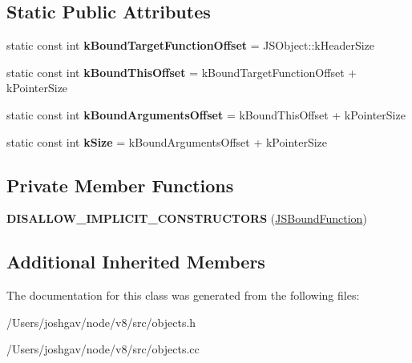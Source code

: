 \subsection*{Static Public Attributes}
\begin{DoxyCompactItemize}
\item 
static const int {\bfseries k\+Bound\+Target\+Function\+Offset} = J\+S\+Object\+::k\+Header\+Size\hypertarget{classv8_1_1internal_1_1_j_s_bound_function_a62d0e4a5d1205ca5db1560e9a5672a83}{}\label{classv8_1_1internal_1_1_j_s_bound_function_a62d0e4a5d1205ca5db1560e9a5672a83}

\item 
static const int {\bfseries k\+Bound\+This\+Offset} = k\+Bound\+Target\+Function\+Offset + k\+Pointer\+Size\hypertarget{classv8_1_1internal_1_1_j_s_bound_function_a9ffc641da476a34eb80b3fdfbb3847b3}{}\label{classv8_1_1internal_1_1_j_s_bound_function_a9ffc641da476a34eb80b3fdfbb3847b3}

\item 
static const int {\bfseries k\+Bound\+Arguments\+Offset} = k\+Bound\+This\+Offset + k\+Pointer\+Size\hypertarget{classv8_1_1internal_1_1_j_s_bound_function_a16d857627dcbec39f014440c076a2e0b}{}\label{classv8_1_1internal_1_1_j_s_bound_function_a16d857627dcbec39f014440c076a2e0b}

\item 
static const int {\bfseries k\+Size} = k\+Bound\+Arguments\+Offset + k\+Pointer\+Size\hypertarget{classv8_1_1internal_1_1_j_s_bound_function_aeebf3de5eb07077231f3dda43c17354f}{}\label{classv8_1_1internal_1_1_j_s_bound_function_aeebf3de5eb07077231f3dda43c17354f}

\end{DoxyCompactItemize}
\subsection*{Private Member Functions}
\begin{DoxyCompactItemize}
\item 
{\bfseries D\+I\+S\+A\+L\+L\+O\+W\+\_\+\+I\+M\+P\+L\+I\+C\+I\+T\+\_\+\+C\+O\+N\+S\+T\+R\+U\+C\+T\+O\+RS} (\hyperlink{classv8_1_1internal_1_1_j_s_bound_function}{J\+S\+Bound\+Function})\hypertarget{classv8_1_1internal_1_1_j_s_bound_function_ae416f0777736c3e887f46ab5e07913c0}{}\label{classv8_1_1internal_1_1_j_s_bound_function_ae416f0777736c3e887f46ab5e07913c0}

\end{DoxyCompactItemize}
\subsection*{Additional Inherited Members}


The documentation for this class was generated from the following files\+:\begin{DoxyCompactItemize}
\item 
/\+Users/joshgav/node/v8/src/objects.\+h\item 
/\+Users/joshgav/node/v8/src/objects.\+cc\end{DoxyCompactItemize}
